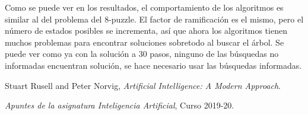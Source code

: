 \documentclass{article}
\begin{document}
Como se puede ver en los resultados, el comportamiento de los algoritmos es similar al del problema del 8-puzzle. El factor de ramificación es el mismo, pero el número de estados posibles se incrementa, así que ahora los algoritmos tienen muchos problemas para encontrar soluciones sobretodo al buscar el árbol. Se puede ver como ya con la solución a 30 pasos, ninguno de las búsquedas no informadas encuentran solución, se hace necesario usar las búsquedas informadas.



\begin{thebibliography}{2}
      Stuart Rusell and Peter Norvig,
      \textit{Artificial Intelligence: A Modern Approach}.

      \bibitem{}
      \textit{Apuntes de la asignatura Inteligencia Artificial}, Curso 2019-20.
      
\end{thebibliography}
\end{document}

